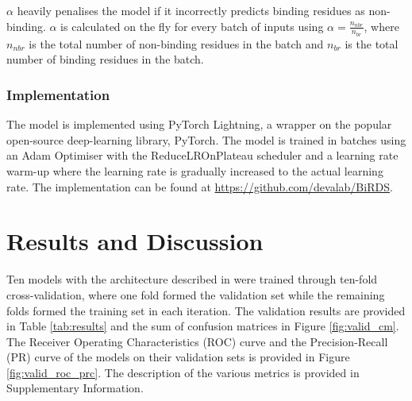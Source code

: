 \documentclass[journal=jcisd8,manuscript=article]{achemso}
\begin{document}
$\alpha$ heavily penalises the model if it incorrectly predicts binding residues as non-binding. $\alpha$ is calculated on the fly for every batch of inputs using $\alpha = \frac{n_{nbr}}{n_{br}}$, where $n_{nbr}$ is the total number of non-binding residues in the batch and $n_{br}$ is the total number of binding residues in the batch.

\subsubsection{Implementation}
\quad The model is implemented using PyTorch Lightning\cite{falcon2019pytorch}, a wrapper on the popular open-source deep-learning library, PyTorch\cite{paszke2019pytorch}. The model is trained in batches using an Adam Optimiser with the ReduceLROnPlateau scheduler and a learning rate warm-up where the learning rate is gradually increased to the actual learning rate. The implementation can be found at \href{https://github.com/devalab/BiRDS}{https://github.com/devalab/BiRDS}.

\section{Results and Discussion}
\quad Ten models with the architecture described in  were trained through ten-fold cross-validation, where one fold formed the validation set while the remaining folds formed the training set in each iteration. The validation results are provided in Table \ref{tab:results} and the sum of confusion matrices in Figure \ref{fig:valid_cm}. The Receiver Operating Characteristics (ROC) curve and the Precision-Recall (PR) curve of the models on their validation sets is provided in Figure \ref{fig:valid_roc_prc}. The description of the various metrics is provided in Supplementary Information.
\end{document}
